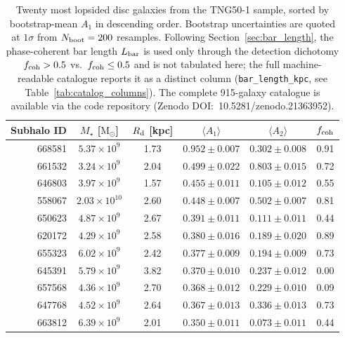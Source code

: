 \documentclass[fleqn,usenatbib]{mnras}
\newcommand{\Am}[1]{A_{#1}}
\newcommand{\Msun}{\mathrm{M}_{\odot}}
\newcommand{\Rd}{R_{\rm d}}
\newcommand{\Amone}{\ensuremath{\Am{1}}}
\newcommand{\Amtwo}{\ensuremath{\Am{2}}}
\begin{document}
\begin{table}
  \centering
  \caption{Twenty most lopsided disc galaxies from the TNG50-1 sample,
    sorted by bootstrap-mean $\Amone$ in descending order.  Bootstrap
    uncertainties are quoted at $1\sigma$ from $N_{\rm boot}=200$
    resamples.  Following Section~\ref{sec:bar_length}, the
    phase-coherent bar length $L_{\rm bar}$ is used only through the
    detection dichotomy $f_{\rm coh} > 0.5$ vs.\ $f_{\rm coh} \le 0.5$
    and is not tabulated here; the full machine-readable catalogue
    reports it as a distinct column
    (\texttt{bar\_length\_kpc}, see Table~\ref{tab:catalog_columns}).
    The complete 915-galaxy catalogue is available via the code
    repository (Zenodo DOI:~10.5281/zenodo.21363952).}
  \label{tab:catalog_excerpt}
  \begin{tabular}{rccccc}
    \toprule
    Subhalo ID  &  $M_\star$ [$\Msun$]  &  $\Rd$ [kpc]  &
    $\langle \Amone \rangle$  &  $\langle \Amtwo \rangle$  &
    $f_{\rm coh}$ \\
    \midrule
    668581  &  $5.37\!\times\!10^{9}$  &  1.73  &  $0.952 \pm 0.007$  &  $0.302 \pm 0.008$  &  0.91  \\
    661532  &  $3.24\!\times\!10^{9}$  &  2.04  &  $0.499 \pm 0.022$  &  $0.803 \pm 0.015$  &  0.72  \\
    646803  &  $3.97\!\times\!10^{9}$  &  1.57  &  $0.455 \pm 0.011$  &  $0.105 \pm 0.012$  &  0.55  \\
    558067  &  $2.03\!\times\!10^{10}$  &  2.60  &  $0.448 \pm 0.007$  &  $0.502 \pm 0.007$  &  0.81  \\
    650623  &  $4.87\!\times\!10^{9}$  &  2.67  &  $0.391 \pm 0.011$  &  $0.111 \pm 0.011$  &  0.44  \\
    620172  &  $4.29\!\times\!10^{9}$  &  2.58  &  $0.380 \pm 0.016$  &  $0.189 \pm 0.020$  &  0.89  \\
    655323  &  $6.02\!\times\!10^{9}$  &  2.42  &  $0.377 \pm 0.009$  &  $0.194 \pm 0.009$  &  0.73  \\
    645391  &  $5.79\!\times\!10^{9}$  &  3.82  &  $0.370 \pm 0.010$  &  $0.237 \pm 0.012$  &  0.00  \\
    657568  &  $4.36\!\times\!10^{9}$  &  2.70  &  $0.368 \pm 0.012$  &  $0.229 \pm 0.010$  &  0.09  \\
    647768  &  $4.52\!\times\!10^{9}$  &  2.64  &  $0.367 \pm 0.013$  &  $0.336 \pm 0.013$  &  0.73  \\
    663812  &  $6.39\!\times\!10^{9}$  &  2.01  &  $0.350 \pm 0.011$  &  $0.073 \pm 0.011$  &  0.44  \\

\end{tabular}
\end{table}
\end{document}
